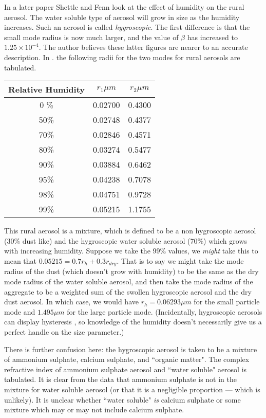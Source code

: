\documentclass[12pt]{article}
\begin{document}
In a later paper Shettle and Fenn \cite{ShettleFenn2:Mybib} look at the effect of humidity on the rural aerosol.
The water soluble type of aerosol will grow in size as the humidity increases.
Such an aerosol is called {\it hygroscopic}.
The first difference is that the small mode radius is now much larger,  and the value
of $\beta$ has increased to $1.25 \times 10^{-4}$. The author believes these latter figures are
 nearer to an accurate description. 
 In \cite{ShettleFenn2:Mybib}. the following radii for the two modes for rural aerosols are 
tabulated.
\begin{center}
\begin{tabular}{| c | c | c | }
\hline
Relative Humidity&  $r_1 \mu m$ & $r_2 \mu m$ \\
\hline
 0 \% &  0.02700 & 0.4300 \\
 50\% &  0.02748 & 0.4377 \\
 70\% &  0.02846 & 0.4571 \\
 80\% &  0.03274 & 0.5477 \\
 90\% &  0.03884 & 0.6462 \\
 95\% &  0.04238 & 0.7078 \\
 98\% &  0.04751 & 0.9728 \\
 99\% &  0.05215 & 1.1755 \\
\hline
\end{tabular}
\end{center}
This rural aerosol is a mixture, which is defined to be a non
 hygroscopic aerosol (30\% dust like) and the hygroscopic water soluble aerosol
(70\%) which grows with increasing humidity.
 Suppose we  take the 99\% values, we {\it might}  take this to mean that
 $0.05215=0.7 r_h+0.3 r_{dry}$. That is to say we might take the mode 
radius of the dust (which doesn't grow with humidity) to be the same
 as the dry mode radius
of the water soluble aerosol, and then take the mode radius of the aggregate
to be a weighted sum of the swollen hygroscopic aerosol and the dry dust aerosol.
 In which case, we would have $r_h=0.06293 \mu m$
for the small particle mode
 and $1.495 \mu m$
for the large particle mode. (Incidentally, hygroscopic aerosols can display
hysteresis \cite{Samparta:Mybib}, so knowledge of the humidity doesn't necessarily give
us a perfect handle on the size parameter.)

There is further confusion here: the hygroscopic aerosol is taken to be a mixture
 of ammonium sulphate, calcium sulphate, and ``organic matter". The complex
refractive index of ammonium sulphate aerosol and ``water soluble" aerosol is tabulated.
It is clear from the data that ammonium sulphate is not in the mixture for water
soluble aerosol (or that it is a negligible proportion --- which is unlikely).
It is unclear whether ``water soluble" {\it is} calcium sulphate or some mixture
which may or may not include calcium sulphate.
\end{document}
